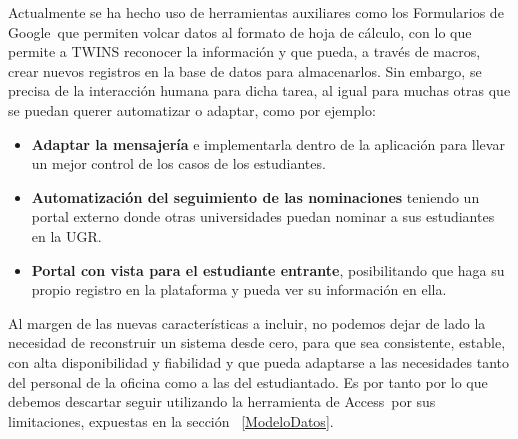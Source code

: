 Actualmente se ha hecho uso de herramientas auxiliares como los Formularios de Google\textregistered \ que permiten volcar datos al formato de hoja de cálculo, con lo que permite a TWINS reconocer la información y que pueda, a través de macros, crear nuevos registros en la base de datos para almacenarlos. Sin embargo, se precisa de la interacción humana para dicha tarea, al igual para muchas otras que se puedan querer automatizar o adaptar, como por ejemplo:

\begin{itemize}
	\item \textbf{Adaptar la mensajería} e implementarla dentro de la aplicación para llevar un mejor control de los casos de los estudiantes.
	\item \textbf{Automatización del seguimiento de las nominaciones} teniendo un portal externo donde otras universidades puedan nominar a sus estudiantes en la UGR.
	\item \textbf{Portal con vista para el estudiante entrante}, posibilitando que haga su propio registro en la plataforma y pueda ver su información en ella.
\end{itemize}

Al margen de las nuevas características a incluir, no podemos dejar de lado la necesidad de reconstruir un sistema desde cero, para que sea consistente, estable, con alta disponibilidad y fiabilidad y que pueda adaptarse a las necesidades tanto del personal de la oficina como a las del estudiantado. Es por tanto por lo que debemos descartar seguir utilizando la herramienta de Access\textregistered \ por sus limitaciones, expuestas en la sección ~\ref{ModeloDatos}.